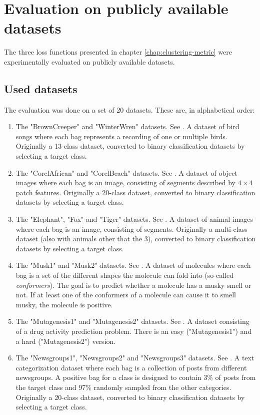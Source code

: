 \chapter{Evaluation on publicly available datasets}\label{chap:toy-dataset}

The three loss functions presented in chapter \ref{chap:clustering-metric} were  experimentally evaluated on publicly available datasets.

\section{Used datasets}

The evaluation was done on a set of 20 datasets. These are, in alphabetical order:
\begin{enumerate}
  \item The "BrownCreeper" and "WinterWren" datasets. See \cite{briggs_rank-loss_2012}. A dataset of bird songs where each bag represents a recording of one or multiple birds. Originally a 13-class dataset, converted to binary classification datasets by selecting a target class.
  \item The "CorelAfrican" and "CorelBeach" datasets. See \cite{chen_miles:_2006}. A dataset of object images where each bag is an image, consisting of segments described by \( 4 \times 4 \) patch features. Originally a 20-class dataset, converted to binary classification datasets by selecting a target class.
  \item The "Elephant", "Fox" and "Tiger" datasets. See \cite{andrews_support_2002}. A dataset of animal images where each bag is an image, consisting of segments. Originally a multi-class dataset (also with animals other that the 3), converted to binary classification datasets by selecting a target class.
  \item The "Musk1" and "Musk2" datasets. See \cite{dietterich_solving_1997}. A dataset of molecules where each bag is a set of the different shapes the molecule can fold into (so-called \textit{conformers}). The goal is to predict whether a molecule has a musky smell or not. If at least one of the conformers of a molecule can cause it to smell musky, the molecule is positive.
  \item The "Mutagenesis1" and "Mutagenesis2" datasets. See \cite{srinivasan_comparing_1995}. A dataset consisting of a drug activity prediction problem. There is an easy ("Mutagenesis1") and a hard ("Mutagenesis2") version.
  \item The "Newsgroups1", "Newsgroups2" and "Newsgroups3" datasets. See \cite{zhou_multi-instance_2008}. A text categorization dataset where each bag is a collection of posts from different newsgroups. A positive bag for a class is designed to contain 3\% of posts from the target class and 97\% randomly sampled from the other categories. Originally a 20-class dataset, converted to binary classification datasets by selecting a target class.

\end{enumerate}
